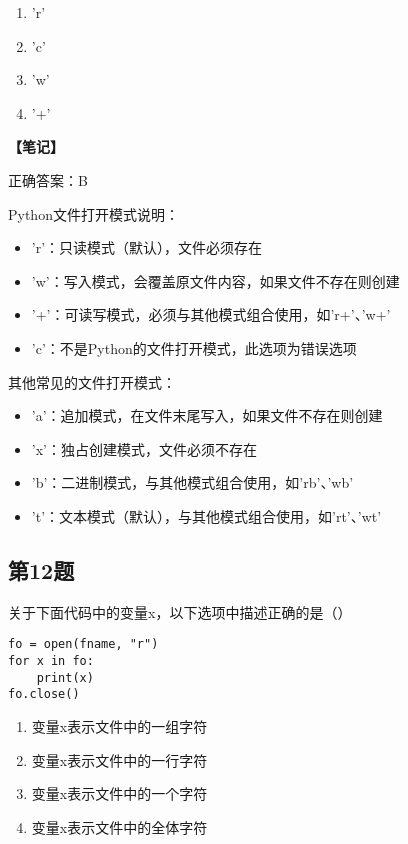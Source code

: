 \begin{enumerate}[label=\Alph*.]
  \item 'r'
  \item 'c'
  \item 'w'
  \item '+'
\end{enumerate}

\begin{mdframed}[linewidth=1pt, linecolor=black]

  \textbf{\color{red}【笔记】}

  正确答案：B

  Python文件打开模式说明：
  \begin{itemize}
    \item 'r'：只读模式（默认），文件必须存在
    \item 'w'：写入模式，会覆盖原文件内容，如果文件不存在则创建
    \item '+'：可读写模式，必须与其他模式组合使用，如'r+'、'w+'
    \item 'c'：不是Python的文件打开模式，此选项为错误选项
  \end{itemize}

  其他常见的文件打开模式：
  \begin{itemize}
    \item 'a'：追加模式，在文件末尾写入，如果文件不存在则创建
    \item 'x'：独占创建模式，文件必须不存在
    \item 'b'：二进制模式，与其他模式组合使用，如'rb'、'wb'
    \item 't'：文本模式（默认），与其他模式组合使用，如'rt'、'wt'
  \end{itemize}

\end{mdframed}

\subsection{第12题}
关于下面代码中的变量x，以下选项中描述正确的是（）
\begin{lstlisting}
fo = open(fname, "r")
for x in fo:
    print(x)
fo.close()
\end{lstlisting}

\begin{enumerate}[label=\Alph*.]
  \item 变量x表示文件中的一组字符
  \item 变量x表示文件中的一行字符
  \item 变量x表示文件中的一个字符
  \item 变量x表示文件中的全体字符
\end{enumerate}


